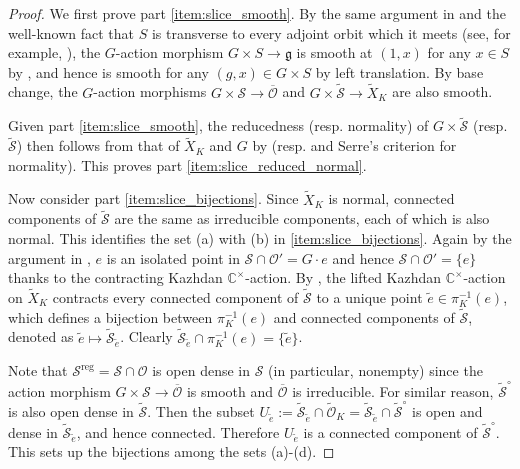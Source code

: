 \documentclass{amsart}
\theoremstyle{definition}
\DeclareMathOperator{\reg}{reg}
\newcommand{\C}{\mathbb{C}}
\newcommand{\cS}{\mathcal{S}}
\newcommand{\fg}{\mathfrak{g}}
\newcommand{\cm}{{\C^\times}}
\newcommand{\0}{\mathcal{O}}
\begin{document}
\begin{proof}
We first prove part \ref{item:slice_smooth}. By the same argument in \cite[\S\,12.4]{Kraft-Procesi:classical} and the well-known fact that $S$ is transverse to every adjoint orbit which it meets (see, for example, \cite[Section 2]{Gan-Ginzburg:quant_Slodowy}), the $G$-action morphism $G \times S \to \fg$ is smooth at $(1,x)$ for any $x\in S$ by \cite[Proposition 17.11.1]{Grothendieck:EGA4}, and hence is smooth for any $(g,x) \in G \times S$ by left translation. By base change, the $G$-action morphisms $G \times \cS \to \overline{\0}$ and $G \times \widetilde{\cS} \to \widetilde{X}_K$ are also smooth. %

Given part \ref{item:slice_smooth}, the reducedness (resp. normality) of $G \times \widetilde{\cS}$ (resp. $\widetilde{\cS}$) then follows from that of $\widetilde{X}_K$ and $G$ by \cite[Proposition 17.5.7]{Grothendieck:EGA4} (resp. \cite[Proposition 17.5.8]{Grothendieck:EGA4} and Serre's criterion for normality). This proves part \ref{item:slice_reduced_normal}.

Now consider part \ref{item:slice_bijections}. Since $\widetilde{X}_K$ is normal, connected components of $\widetilde{\cS}$ are the same as irreducible components, each of which is also normal. This identifies the set (a) with (b) in \ref{item:slice_bijections}. Again by the argument in \cite[\S\,12.4]{Kraft-Procesi:classical}, $e$ is an isolated point in $\cS \cap \0'=G \cdot e$ and hence $\cS \cap \0' = \{e\}$ thanks to the contracting Kazhdan $\cm$-action. By , the lifted Kazhdan $\cm$-action on $\widetilde{X}_K$ contracts every connected component of $\widetilde{\cS}$ to a unique point $\widetilde{e} \in \pi_K^{-1}(e)$, which defines a bijection between $\pi_K^{-1}(e)$ and connected components of $\widetilde{\cS}$, denoted as $\widetilde{e} \mapsto \widetilde{\cS}_{\widetilde{e}}$. Clearly $\widetilde{\cS}_{\widetilde{e}} \cap \pi_K^{-1}(e) = \{\widetilde{e}\}$.

Note that $\cS^{\reg} = \cS \cap \0$ is open dense in $\cS$ (in particular, nonempty) since the action morphism $G \times \cS \to \overline{\0}$ is smooth and $\overline{\0}$ is irreducible. For similar reason, $\widetilde{\cS}^{\circ}$ is also open dense in $\widetilde{\cS}$.
Then the subset $U_{\widetilde{e}} := \widetilde{\cS}_{\widetilde{e}} \cap \widetilde{\0}_K = \widetilde{\cS}_{\widetilde{e}} \cap \widetilde{\cS}^{\circ}$ is open and dense in $\widetilde{\cS}_{\widetilde{e}}$, and hence connected. Therefore $U_{\widetilde{e}}$ is a connected component of $\widetilde{\cS}^{\circ}$. This sets up the bijections among the sets (a)-(d).


\end{proof}
\end{document}
